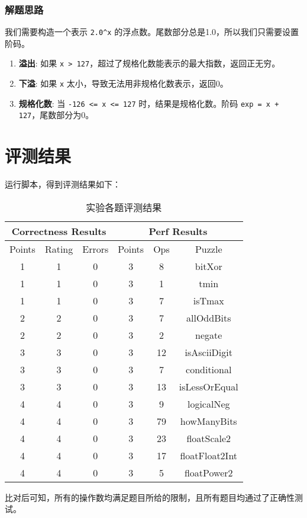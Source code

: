 \documentclass{article}
\begin{document}
\subsubsection{解题思路}
我们需要构造一个表示 \texttt{2.0\^{}x} 的浮点数。尾数部分总是1.0，所以我们只需要设置阶码。
\begin{enumerate}
    \item \textbf{溢出}: 如果 \texttt{x > 127}，超过了规格化数能表示的最大指数，返回正无穷。
    \item \textbf{下溢}: 如果 \texttt{x} 太小，导致无法用非规格化数表示，返回0。
    \item \textbf{规格化数}: 当 \texttt{-126 <= x <= 127} 时，结果是规格化数。阶码 \texttt{exp = x + 127}，尾数部分为0。
\end{enumerate}

\section{评测结果}
运行脚本，得到评测结果如下：
\begin{table}[H]
\centering
\begin{tabular}{|c|c|c|c|c|c|}
\hline
\multicolumn{3}{|c|}{Correctness Results} & \multicolumn{3}{c|}{Perf Results} \\
\hline
Points & Rating & Errors & Points & Ops & Puzzle \\
\hline
1 & 1 & 0 & 3 & 8 & bitXor \\
1 & 1 & 0 & 3 & 1 & tmin \\
1 & 1 & 0 & 3 & 7 & isTmax \\
2 & 2 & 0 & 3 & 7 & allOddBits \\
2 & 2 & 0 & 3 & 2 & negate \\
3 & 3 & 0 & 3 & 12 & isAsciiDigit \\
3 & 3 & 0 & 3 & 7 & conditional \\
3 & 3 & 0 & 3 & 13 & isLessOrEqual \\
4 & 4 & 0 & 3 & 9 & logicalNeg \\
4 & 4 & 0 & 3 & 79 & howManyBits \\
4 & 4 & 0 & 3 & 23 & floatScale2 \\
4 & 4 & 0 & 3 & 17 & floatFloat2Int \\
4 & 4 & 0 & 3 & 5 & floatPower2 \\
\hline
\end{tabular}
\caption{实验各题评测结果}
\end{table}
比对后可知，所有的操作数均满足题目所给的限制，且所有题目均通过了正确性测试。
\end{document}
